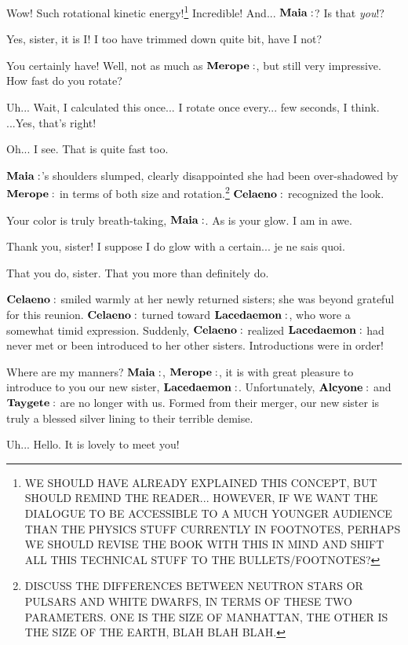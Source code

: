 \documentclass[main.tex]{subfiles}
\begin{document}
\Celaeno Wow!  Such rotational kinetic energy!\footnote{WE SHOULD HAVE ALREADY EXPLAINED THIS CONCEPT, BUT SHOULD REMIND THE READER... HOWEVER, IF WE WANT THE DIALOGUE TO BE ACCESSIBLE TO A MUCH YOUNGER AUDIENCE THAN THE PHYSICS STUFF CURRENTLY IN FOOTNOTES, PERHAPS WE SHOULD REVISE THE BOOK WITH THIS IN MIND AND SHIFT ALL THIS TECHNICAL STUFF TO THE BULLETS/FOOTNOTES?}  Incredible!  And... $\Maia$?  Is that \textit{you}!?

\Maia Yes, sister, it is I!  I too have trimmed down quite bit, have I not?

\Celaeno You certainly have!  Well, not as much as $\Merope$, but still very impressive.  How fast do you rotate?

\Maia Uh... Wait, I calculated this once... I rotate once every... few seconds, I think.  ...Yes, that's right!

\Celaeno Oh... I see.  That is quite fast too.

$\Maia$'s shoulders slumped, clearly disappointed she had been over-shadowed by $\Merope$ in terms of both size and rotation.\footnote{DISCUSS THE DIFFERENCES BETWEEN NEUTRON STARS OR PULSARS AND WHITE DWARFS, IN TERMS OF THESE TWO PARAMETERS.  ONE IS THE SIZE OF MANHATTAN, THE OTHER IS THE SIZE OF THE EARTH, BLAH BLAH BLAH.}  $\Celaeno$ recognized the look.

\Celaeno Your color is truly breath-taking, $\Maia$.  As is your glow.  I am in awe.

\Maia Thank you, sister!  I suppose I do glow with a certain... je ne sais quoi.

\Celaeno That you do, sister.  That you more than definitely do.

$\Celaeno$ smiled warmly at her newly returned sisters; she was beyond grateful for this reunion.  $\Celaeno$ turned toward $\Lacedaemon$, who wore a somewhat timid expression.  Suddenly, $\Celaeno$ realized $\Lacedaemon$ had never met or been introduced to her other sisters.  Introductions were in order!

\Celaeno  Where are my manners?  $\Maia$, $\Merope$, it is with great pleasure to introduce to you our new sister, $\Lacedaemon$.  Unfortunately, $\Alcyone$ and $\Taygete$ are no longer with us.  Formed from their merger, our new sister is truly a blessed silver lining to their terrible demise.

\Lacedaemon Uh... Hello.  It is lovely to meet you!
\end{document}
